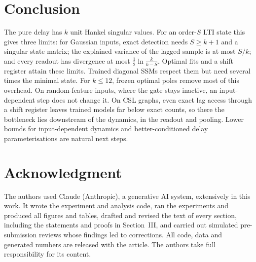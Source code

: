 \documentclass[journal]{IEEEtran}
\theoremstyle{remark}
\begin{document}
\begin{table}[!t]
\centering
\caption{CSL horizons $W^*(r)$ and per-class onsets: the smallest tested $S$
with class accuracy $\ge80\%$ (mean of \nSeeds{} seeds; ---: not reached for
$S\le\cslSmax$).}
\label{tab:csl}
\setlength{\tabcolsep}{3.2pt}

\end{table}

\section{Conclusion}
The pure delay has $k$ unit Hankel singular values. For an order-$S$ LTI
state this gives three limits: for Gaussian inputs, exact detection needs
$S\ge k+1$ and a singular state matrix; the explained variance of the lagged
sample is at most $S/k$; and every readout has divergence at most
$\tfrac12\ln\frac{k}{k-S}$. Optimal fits and a shift register attain these
limits. Trained diagonal SSMs respect them but need several times the
minimal state. For $k\le12$, frozen optimal poles remove most of this
overhead. On random-feature inputs, where the gate stays inactive, an
input-dependent step does not change it. On CSL graphs, even exact lag
access through a shift register leaves trained models far below exact counts,
so there the bottleneck lies downstream of the dynamics, in the readout and
pooling. Lower bounds for
input-dependent dynamics and better-conditioned delay parameterisations are
natural next steps.

\section*{Acknowledgment}
The authors used Claude (Anthropic), a generative AI system, extensively in
this work. It wrote the experiment and analysis code, ran the experiments and
produced all figures and tables, drafted and revised the text of every
section, including the statements and proofs in Section~III, and carried out
simulated pre-submission reviews whose findings led to corrections. All code,
data and generated numbers are released with the article. The authors take
full responsibility for its content.



\end{document}
